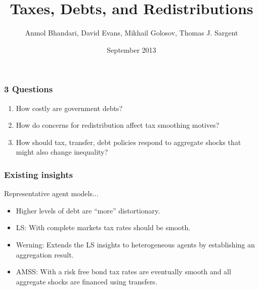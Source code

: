 \documentclass{beamer}
\title {Taxes, Debts,  and Redistributions}
\author{Anmol Bhandari, David Evans, Mikhail Golosov, Thomas J. Sargent}
\date{September 2013}
\begin{document}
%
\begin{frame}
\titlepage

\end{frame}


\begin{frame}
\frametitle{3 Questions}

\begin{enumerate}
 \item How costly are government debts?
 \vspace{2mm} 
 \item How do concerns for redistribution affect tax smoothing motives?
\vspace{2mm} 
 \item How should tax, transfer, debt policies respond to aggregate shocks that might also change inequality?
\end{enumerate}

\end{frame}


\begin{frame}
\frametitle{Existing insights}
Representative agent models...

\begin{itemize}
 \item Higher levels of debt are ``more'' distortionary.
 \vspace{2mm} 
 \item LS: With complete markets tax rates should be smooth.  
 \vspace{2mm} 
 \item Werning: Extends the LS insights to heterogeneous agents by establishing an aggregation result.
 \vspace{2mm} 
 \item AMSS: With a risk free bond tax rates are eventually smooth and all aggregate shocks are financed using transfers.
\end{itemize}



\end{frame}
\end{document}
